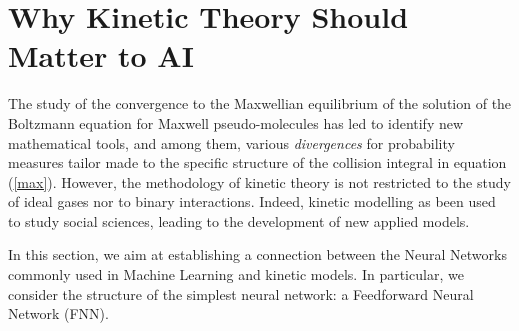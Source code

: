 \documentclass{article}
\newcommand{\bv}{\mathrm{BV}}
\newcommand{\fer}[1]{(\ref{#1})}
\newcommand{\R}{\mathbb R}
\def\R{\mathbb{R}}
\def\bv{{\bf v}}
\def\bw{{\bf w}}
\begin{document}
\section{Why Kinetic Theory Should Matter to AI}

% 
% 
The study of the convergence to the Maxwellian equilibrium of the solution of the Boltzmann equation for Maxwell pseudo-molecules has led to identify new mathematical tools, and among them, various \emph{divergences} for probability measures tailor made to the specific structure of the collision integral in equation \fer{max}.  
% 
However, the methodology of kinetic theory is not restricted to the study of ideal gases nor to binary interactions. 
% 
Indeed, kinetic modelling as been used to study social sciences, leading to the development of new applied models.\cite{NPT,PT13}
% 

% 

% 
In this section, we aim at establishing a connection between the Neural Networks commonly used in Machine Learning and kinetic models. 
% 
In particular, we consider the structure of the simplest neural network: a Feedforward Neural Network (FNN).
% 
\end{document}
